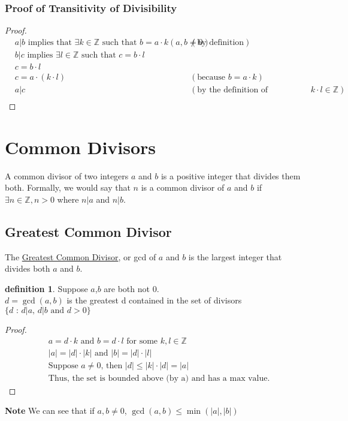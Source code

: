 \documentclass[10pt]{article}
\newcommand{\Z}{\mathbb{Z}}
\theoremstyle{definition}
\newtheorem{definition}[theorem]{definition}
\theoremstyle{remark}
\def\Z{\mathbb{ Z}}
\begin{document}
\subsubsection{Proof of Transitivity of Divisibility}
\begin{proof}
\begin{align*}
&a|b \text{ implies that } \exists k \in \Z \text{ such that } b=a \cdot k (a,b \ne 0) & (\text{by definition})\\
&b|c \text{ implies } \exists l \in \Z \text{ such that } c=b\cdot l\\
&c = b\cdot l\\
&c = a\cdot (k\cdot l) & (\text{because } b=a \cdot k)\\
&a|c & (\text{by the definition of divisibility, because } k \cdot l \in \Z)\\
\end{align*}
\end{proof}
\pagebreak
\section{Common Divisors}
A common divisor of two integers $a$ and $b$ is a positive integer that divides them both.  Formally, we would say that $n$ is a common divisor of $a$ and $b$ if $\exists n \in \Z, n > 0$ where $n|a$ and $n|b$.
\subsection{Greatest Common Divisor}
The \underline{Greatest Common Divisor}, or gcd of $a$ and $b$ is the largest integer that divides both $a$ and $b$.
\begin{definition}\label{gcd}
Suppose $a$,$b$ are both not 0.\\
$d = \gcd(a,b)$ is the greatest d contained in the set of divisors $\{d\text{ : }d|a\text{, }d|b\text{ and }d > 0\}$
\end{definition}
\begin{proof}
\begin{align*}
& a = d\cdot k \text{ and } b = d\cdot l \text{ for some } k,l \in \Z\\
&|a| = |d|\cdot|k| \text{ and } |b|=|d|\cdot|l|\\
&\text{Suppose } a \neq 0 \text{, then } |d| \leq |k|\cdot|d|=|a|\\
&\text{Thus, the set is bounded above (by a) and has a max value.}
\end{align*}
\end{proof}
\textbf{Note} We can see that if $a,b\neq0$, $\gcd(a,b)\leq \min(|a|,|b|)$
\end{document}
